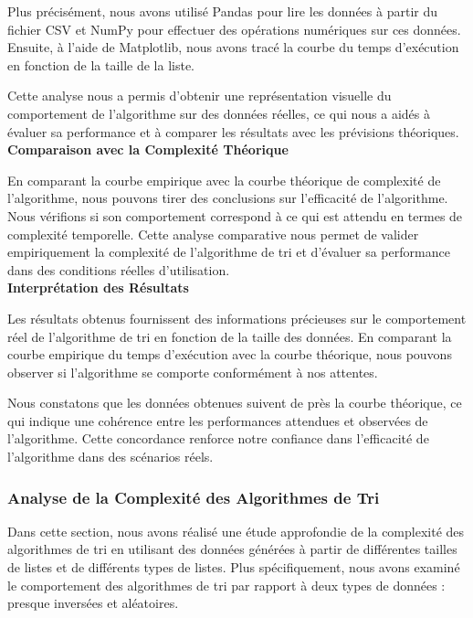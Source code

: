 \documentclass[a4paper,12pt]{article}
\begin{document}
Plus précisément, nous avons utilisé Pandas pour lire les données à partir du fichier CSV et NumPy pour effectuer des opérations numériques sur ces données. Ensuite, à l'aide de Matplotlib, nous avons tracé la courbe du temps d'exécution en fonction de la taille de la liste.

Cette analyse nous a permis d'obtenir une représentation visuelle du comportement de l'algorithme sur des données réelles, ce qui nous a aidés à évaluer sa performance et à comparer les résultats avec les prévisions théoriques.
\\

\textbf{Comparaison avec la Complexité Théorique}

En comparant la courbe empirique avec la courbe théorique de complexité de l'algorithme, nous pouvons tirer des conclusions sur l'efficacité de l'algorithme. Nous vérifions si son comportement correspond à ce qui est attendu en termes de complexité temporelle. Cette analyse comparative nous permet de valider empiriquement la complexité de l'algorithme de tri et d'évaluer sa performance dans des conditions réelles d'utilisation.\\

\textbf{Interprétation des Résultats}

Les résultats obtenus fournissent des informations précieuses sur le comportement réel de l'algorithme de tri en fonction de la taille des données. En comparant la courbe empirique du temps d'exécution avec la courbe théorique, nous pouvons observer si l'algorithme se comporte conformément à nos attentes.

Nous constatons que les données obtenues suivent de près la courbe théorique, ce qui indique une cohérence entre les performances attendues et observées de l'algorithme. Cette concordance renforce notre confiance dans l'efficacité de l'algorithme dans des scénarios réels.\\
\subsubsection{Analyse de la Complexité des Algorithmes de Tri}
Dans cette section, nous avons réalisé une étude approfondie de la complexité des algorithmes de tri en utilisant des données générées à partir de différentes tailles de listes et de différents types de listes. Plus spécifiquement, nous avons examiné le comportement des algorithmes de tri par rapport à deux types de données : presque inversées et aléatoires.
\end{document}

